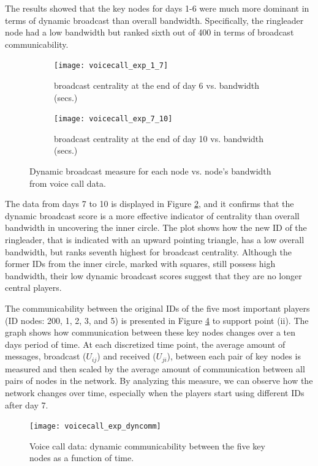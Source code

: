 The results showed that the key nodes for days 1-6 were much more dominant in terms of dynamic broadcast than overall bandwidth. Specifically, the ringleader node had a low bandwidth but ranked sixth out of 400 in terms of broadcast communicability.

\begin{figure}[h]
     \centering
     \begin{subfigure}[b]{0.49\textwidth}
         \centering
         \texttt{[image: voicecall\_exp\_1\_7]}
         \caption{broadcast centrality at the end of day 6 vs. bandwidth (secs.)}
         \label{fig:ve1a}
     \end{subfigure}
     \hfill
     \begin{subfigure}[b]{0.49\textwidth}
         \centering
         \texttt{[image: voicecall\_exp\_7\_10]}
         \caption{broadcast centrality at the end of day 10 vs. bandwidth (secs.)}
         \label{fig:ve1b}
     \end{subfigure}
     \caption{Dynamic broadcast measure for each node vs. node's bandwidth from voice call data.}
     \label{fig:ve1}
\end{figure}

The data from days 7 to 10 is displayed in Figure \ref{fig:ve1b}, and it confirms that the dynamic broadcast score is a more effective indicator of centrality than overall bandwidth in uncovering the inner circle. The plot shows how the new ID of the ringleader, that is indicated with an upward pointing triangle, has a low overall bandwidth, but ranks seventh highest for broadcast centrality. Although the former IDs from the inner circle, marked with squares, still possess high bandwidth, their low dynamic broadcast scores suggest that they are no longer central players.

\newpage

The communicability between the original IDs of the five most important players (ID nodes: 200, 1, 2, 3, and 5) is presented in Figure \ref{fig:ve2} to support point (ii). The graph shows how communication between these key nodes changes over a ten days period of time. At each discretized time point, the average amount of messages, broadcast ($U_{ij}$) and received ($U_{ji}$), between each pair of key nodes is measured and then scaled by the average amount of communication between all pairs of nodes in the network. By analyzing this measure, we can observe how the network changes over time, especially when the players start using different IDs after day 7.

\begin{figure}[h]\centering
    \texttt{[image: voicecall\_exp\_dyncomm]}
    \caption{Voice call data: dynamic communicability between the five key nodes as a function of time.}
    \label{fig:ve2}
    \bigskip
\end{figure}